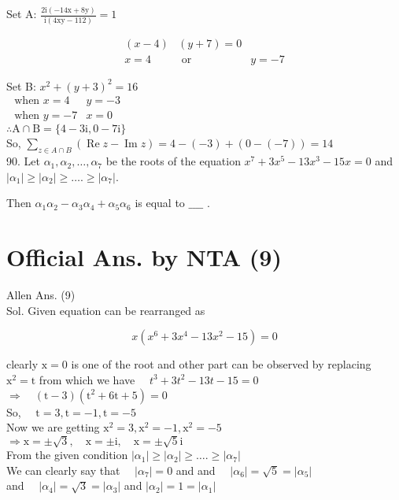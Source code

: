 \documentclass[10pt]{article}
\begin{document}
Set A: \(\frac{2 \mathrm{i}(-14 \mathrm{x}+8 \mathrm{y})}{\mathrm{i}(4 \mathrm{xy}-112)}=1\)

\[
\begin{array}{lll}
(x-4) & (y+7)=0 & \\
x=4 & \text { or } & y=-7
\end{array}
\]

Set B: \(x^{2}+(y+3)^{2}=16\)\\
\(\begin{array}{ll}\text { when } x=4 & y=-3 \\ \text { when } y=-7 & x=0\end{array}\)\\
\(\therefore \mathrm{A} \cap \mathrm{B}=\{4-3 \mathrm{i}, 0-7 \mathrm{i}\}\)\\
So, \(\sum_{z \in A \cap B}(\operatorname{Re} z-\operatorname{Im} z)=4-(-3)+(0-(-7))=14\)\\
90. Let \(\alpha_{1}, \alpha_{2}, \ldots, \alpha_{7}\) be the roots of the equation \(x^{7}+ 3 x^{5}-13 x^{3}-15 x=0\) and \(\left|\alpha_{1}\right| \geq\left|\alpha_{2}\right| \geq \ldots . \geq\left|\alpha_{7}\right|\).

Then \(\alpha_{1} \alpha_{2}-\alpha_{3} \alpha_{4}+\alpha_{5} \alpha_{6}\) is equal to \(\_\_\_\_\) .

\section*{Official Ans. by NTA (9)}
Allen Ans. (9)\\
Sol. Given equation can be rearranged as

\[
x\left(x^{6}+3 x^{4}-13 x^{2}-15\right)=0
\]

clearly \(\mathrm{x}=0\) is one of the root and other part can be observed by replacing \(\mathrm{x}^{2}=\mathrm{t}\) from which we have \(\quad t^{3}+3 t^{2}-13 t-15=0\)\\
\(\Rightarrow \quad(\mathrm{t}-3)\left(\mathrm{t}^{2}+6 \mathrm{t}+5\right)=0\)\\
So, \(\quad \mathrm{t}=3, \mathrm{t}=-1, \mathrm{t}=-5\)\\
Now we are getting \(\mathrm{x}^{2}=3, \mathrm{x}^{2}=-1, \mathrm{x}^{2}=-5\)\\
\(\Rightarrow \mathrm{x}= \pm \sqrt{3}, \quad \mathrm{x}= \pm \mathrm{i}, \quad \mathrm{x}= \pm \sqrt{5} \mathrm{i}\)\\
From the given condition \(\left|\alpha_{1}\right| \geq\left|\alpha_{2}\right| \geq \ldots . \geq\left|\alpha_{7}\right|\)\\
We can clearly say that \(\quad\left|\alpha_{7}\right|=0\) and and \(\quad\left|\alpha_{6}\right|=\sqrt{5}=\left|\alpha_{5}\right|\)\\
and \(\quad\left|\alpha_{4}\right|=\sqrt{3}=\left|\alpha_{3}\right|\) and \(\left|\alpha_{2}\right|=1=\left|\alpha_{1}\right|\)
\end{document}
